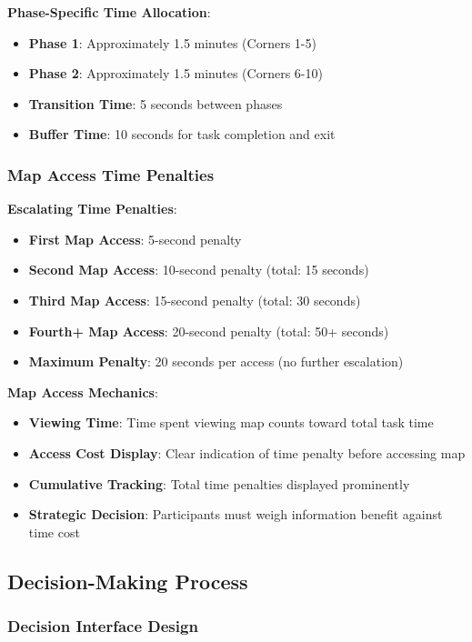 \documentclass[12pt]{article}
\begin{document}
\textbf{Phase-Specific Time Allocation}:
\begin{itemize}
    \item \textbf{Phase 1}: Approximately 1.5 minutes (Corners 1-5)
    \item \textbf{Phase 2}: Approximately 1.5 minutes (Corners 6-10)
    \item \textbf{Transition Time}: 5 seconds between phases
    \item \textbf{Buffer Time}: 10 seconds for task completion and exit
\end{itemize}

\subsubsection{Map Access Time Penalties}

\textbf{Escalating Time Penalties}:
\begin{itemize}
    \item \textbf{First Map Access}: 5-second penalty
    \item \textbf{Second Map Access}: 10-second penalty (total: 15 seconds)
    \item \textbf{Third Map Access}: 15-second penalty (total: 30 seconds)
    \item \textbf{Fourth+ Map Access}: 20-second penalty (total: 50+ seconds)
    \item \textbf{Maximum Penalty}: 20 seconds per access (no further escalation)
\end{itemize}

\textbf{Map Access Mechanics}:
\begin{itemize}
    \item \textbf{Viewing Time}: Time spent viewing map counts toward total task time
    \item \textbf{Access Cost Display}: Clear indication of time penalty before accessing map
    \item \textbf{Cumulative Tracking}: Total time penalties displayed prominently
    \item \textbf{Strategic Decision}: Participants must weigh information benefit against time cost
\end{itemize}

\subsection{Decision-Making Process}

\subsubsection{Decision Interface Design}
\end{document}
